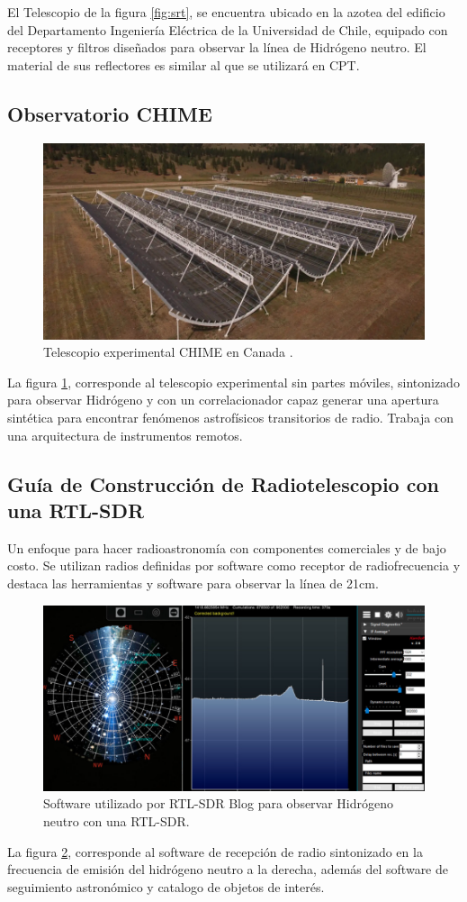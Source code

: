 El Telescopio de la figura \ref{fig:srt}, se encuentra ubicado en la azotea del edificio del Departamento Ingeniería Eléctrica de la Universidad de Chile, equipado con receptores y filtros diseñados para observar la línea de Hidrógeno neutro. El material de sus reflectores es similar al que se utilizará en CPT.

\subsection{Observatorio CHIME}

\begin{figure}
    \centering
    \includegraphics[width = 12cm]{img/chime.png}
    \caption{Telescopio experimental CHIME en Canada \cite{CHIME}.}
    \label{fig:chime}
\end{figure}

La figura \ref{fig:chime}, corresponde al telescopio experimental sin partes móviles, sintonizado para observar Hidrógeno y con un correlacionador capaz generar una apertura sintética para encontrar fenómenos astrofísicos transitorios de radio. Trabaja con una arquitectura de instrumentos remotos.

\subsection{Guía de Construcción de Radiotelescopio con una RTL-SDR}

Un enfoque para hacer radioastronomía con componentes comerciales y de bajo costo. Se utilizan radios definidas por software como receptor de radiofrecuencia y destaca las herramientas y software para observar la línea de 21cm.

\begin{figure}
    \centering
    \includegraphics[width = 12cm]{img/rtlsdr.png}
    \caption{Software utilizado por RTL-SDR Blog para observar Hidrógeno neutro con una RTL-SDR\cite{RTLSDR2018}.}
    \label{fig:rtl}
\end{figure}

La figura \ref{fig:rtl}, corresponde al software de recepción de radio sintonizado en la frecuencia de emisión del hidrógeno neutro a la derecha, además del software de seguimiento astronómico y catalogo de objetos de interés.
